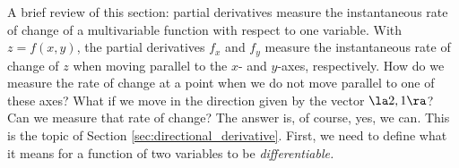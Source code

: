 A brief review of this section: partial derivatives measure the instantaneous rate of change of a multivariable function with respect to one variable. %
With $z=f(x,y)$, the partial derivatives $f_x$ and $f_y$ measure the instantaneous rate of change of $z$ when moving parallel to the $x$- and $y$-axes, respectively. How do we measure the rate of change at a point when we do not move parallel to one of these axes? What if we move in the direction given by the vector $\la 2,1\ra$? Can we measure that rate of change? The answer is, of course, yes, we can. This is the topic of Section \ref{sec:directional_derivative}. First, we need to define what it means for a function of two variables to be \textit{differentiable.}

